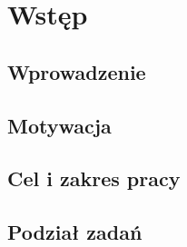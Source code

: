 \chapter{Wstęp}
\section{Wprowadzenie}
\section{Motywacja}
\section{Cel i zakres pracy}
\section{Podział zadań}

